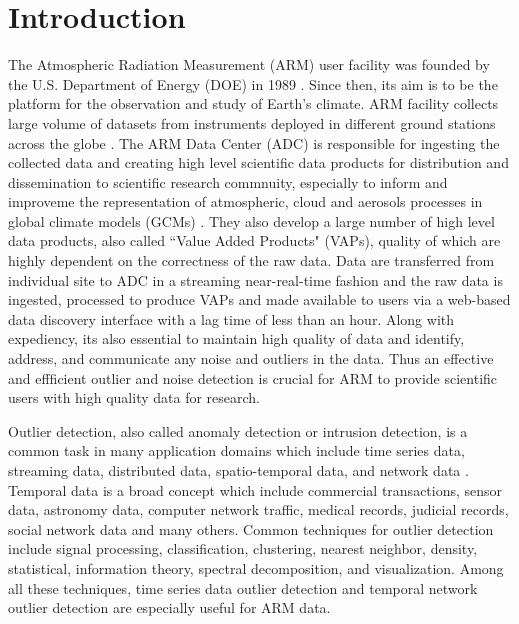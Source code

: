 \section{Introduction}
The Atmospheric Radiation Measurement (ARM) user facility was founded by
the U.S. Department of Energy (DOE) in 1989 \cite{ARM}. Since then, its
aim is to be the platform for the observation and study of Earth's
climate. ARM facility collects large volume of datasets from instruments deployed in
different ground stations across the globe \cite{stokes1994atmospheric}.
The ARM Data Center (ADC) is responsible for ingesting the collected data and
creating high level scientific data products for distribution and
dissemination to scientific research commnuity, especially to inform and
improveme the representation of atmospheric, cloud and aerosols
processes in global climate models (GCMs)
\cite{gaustad2014scientific}. They also develop a large number of 
high level data products, also
called ``Value Added Products" (VAPs), quality of which are highly dependent on the
correctness of the raw data. Data are transferred from individual site
to ADC in a streaming near-real-time fashion and the raw data is
ingested, processed to produce VAPs and made available to users via a
web-based data discovery interface with a lag time of less than an hour.
Along with expediency, its also essential to maintain high quality of
data and identify, address, and communicate any noise and outliers in
the data. Thus an effective and effficient outlier and noise detection
is crucial for ARM to provide scientific users with high quality data
for research.

Outlier detection, also called anomaly detection or intrusion detection,
is a common task in many application domains which include time
series data, streaming data, distributed data, spatio-temporal
data, and network data \cite{gupta2014outlier}. Temporal data is
a broad concept which include commercial transactions, sensor
data, astronomy data, computer network traffic, medical records,
judicial records, social network data and many others. Common
techniques for outlier detection include signal processing,
classification, clustering, nearest neighbor, density,
statistical, information theory, spectral decomposition, and
visualization. Among all these techniques, time series data
outlier detection and temporal network outlier detection are
especially useful for ARM data.

